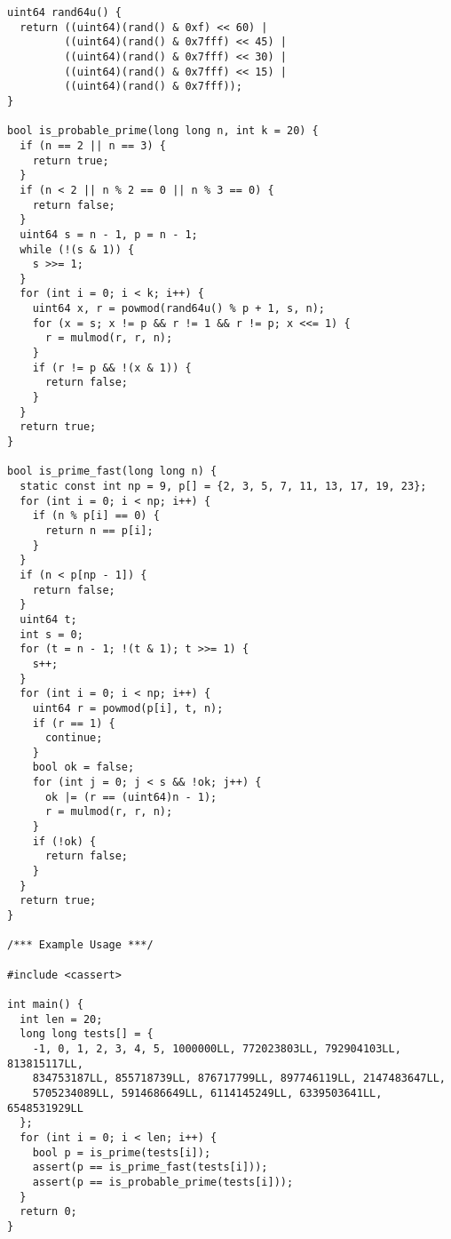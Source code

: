 \begin{lstlisting}
uint64 rand64u() {
  return ((uint64)(rand() & 0xf) << 60) |
         ((uint64)(rand() & 0x7fff) << 45) |
         ((uint64)(rand() & 0x7fff) << 30) |
         ((uint64)(rand() & 0x7fff) << 15) |
         ((uint64)(rand() & 0x7fff));
}

bool is_probable_prime(long long n, int k = 20) {
  if (n == 2 || n == 3) {
    return true;
  }
  if (n < 2 || n % 2 == 0 || n % 3 == 0) {
    return false;
  }
  uint64 s = n - 1, p = n - 1;
  while (!(s & 1)) {
    s >>= 1;
  }
  for (int i = 0; i < k; i++) {
    uint64 x, r = powmod(rand64u() % p + 1, s, n);
    for (x = s; x != p && r != 1 && r != p; x <<= 1) {
      r = mulmod(r, r, n);
    }
    if (r != p && !(x & 1)) {
      return false;
    }
  }
  return true;
}

bool is_prime_fast(long long n) {
  static const int np = 9, p[] = {2, 3, 5, 7, 11, 13, 17, 19, 23};
  for (int i = 0; i < np; i++) {
    if (n % p[i] == 0) {
      return n == p[i];
    }
  }
  if (n < p[np - 1]) {
    return false;
  }
  uint64 t;
  int s = 0;
  for (t = n - 1; !(t & 1); t >>= 1) {
    s++;
  }
  for (int i = 0; i < np; i++) {
    uint64 r = powmod(p[i], t, n);
    if (r == 1) {
      continue;
    }
    bool ok = false;
    for (int j = 0; j < s && !ok; j++) {
      ok |= (r == (uint64)n - 1);
      r = mulmod(r, r, n);
    }
    if (!ok) {
      return false;
    }
  }
  return true;
}

/*** Example Usage ***/

#include <cassert>

int main() {
  int len = 20;
  long long tests[] = {
    -1, 0, 1, 2, 3, 4, 5, 1000000LL, 772023803LL, 792904103LL, 813815117LL,
    834753187LL, 855718739LL, 876717799LL, 897746119LL, 2147483647LL,
    5705234089LL, 5914686649LL, 6114145249LL, 6339503641LL, 6548531929LL
  };
  for (int i = 0; i < len; i++) {
    bool p = is_prime(tests[i]);
    assert(p == is_prime_fast(tests[i]));
    assert(p == is_probable_prime(tests[i]));
  }
  return 0;
}
\end{lstlisting}
